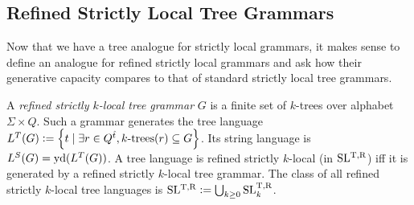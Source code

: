 \subsection{Refined Strictly Local Tree Grammars}

Now that we have a tree analogue for strictly local grammars, it makes sense to define an analogue for refined strictly local grammars and ask how their generative capacity compares to that of standard strictly local tree grammars.
%
\begin{definition}
    A \emph{refined strictly $k$-local tree grammar} $G$ is a finite set of $k$-trees over alphabet $\Sigma \times Q$.
    Such a grammar generates the tree language $L^T(G) \is \setof{ t \mid \exists r \in Q^{\augmented{t}}, \ktrees[k](r) \subseteq G }$.
    Its string language is $L^S(G) = \Yield(L^T(G))$.
    A tree language is refined strictly $k$-local (in $\SLTR$) iff it is generated by a refined strictly $k$-local tree grammar.
    The class of all refined strictly $k$-local tree languages is $\SLTR \is \bigcup_{k \geq 0} \SLTR[k]$.
\end{definition}
%
